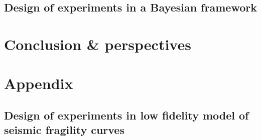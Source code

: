 \documentclass[a4paper]{book}
\renewcommand{\familydefault}{\sfdefault}
\begin{document}
\chapter{Design of experiments in a Bayesian framework}\label{chap:doe}






\part{Conclusion \& perspectives}\label{part:conclusion}


\appendix
\part*{Appendix}\label{part:appendix}


\chapter{Design of experiments in low fidelity model of seismic fragility curves}\label{app:chap:ESAIM}



 
 
\printbibliography 
{}

\newpage
\pagestyle{empty}
\backmatter
\ \cleardoublepage
\ \newpage
\renewcommand{\familydefault}{\sfdefault}


 
\end{document}
